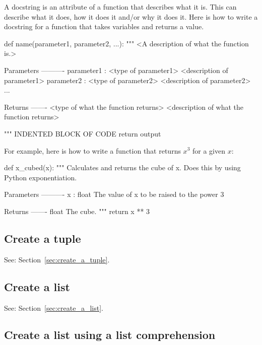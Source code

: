 A docstring is an attribute of a function that describes what it is. This can
describe what it does, how it does it and/or why it does it.
Here is how to write a docstring for a function that takes variables and returns
a value.


\begin{pyin}
def name(parameter1, parameter2, ...):
    """
    <A description of what the function is.>

    Parameters
    ----------
    parameter1 : <type of parameter1>
        <description of parameter1>
    parameter2 : <type of parameter2>
        <description of parameter2>
    ...

    Returns
    -------
    <type of what the function returns>
        <description of what the function returns>

    """
    INDENTED BLOCK OF CODE
    return output
\end{pyin}



For example, here is how to write a function that returns \(x ^ 3\) for a given
\(x\):




\begin{pyin}
def x_cubed(x):
    """
    Calculates and returns the cube of x. Does this by using Python
    exponentiation.

    Parameters
    ----------
    x : float
        The value of x to be raised to the power 3

    Returns
    -------
    float
        The cube.
    """
    return x ** 3
\end{pyin}





\subsection{Create a tuple}

See: Section~\ref{sec:create_a_tuple}.



\subsection{Create a list}

See: Section~\ref{sec:create_a_list}.


\subsection{Create a list using a list comprehension}

